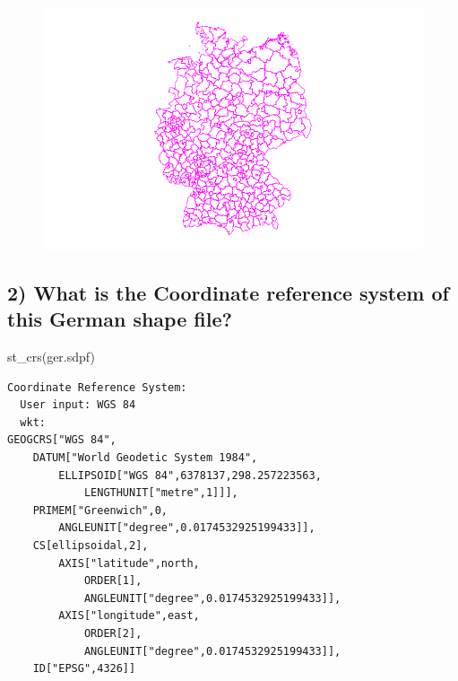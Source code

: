 \documentclass[
  letterpaper,
]{scrbook}
\newenvironment{Shaded}{\begin{snugshade}}{\end{snugshade}}
\newcommand{\FunctionTok}[1]{\textcolor[rgb]{0.28,0.35,0.67}{#1}}
\newcommand{\NormalTok}[1]{\textcolor[rgb]{0.00,0.23,0.31}{#1}}
\begin{document}
\begin{figure}[H]

{\centering \includegraphics{03_exercise1_files/figure-pdf/unnamed-chunk-4-1.pdf}

}

\end{figure}

\hypertarget{what-is-the-coordinate-reference-system-of-this-german-shape-file}{%
\subsection*{2) What is the Coordinate reference system of this German
shape
file?}\label{what-is-the-coordinate-reference-system-of-this-german-shape-file}}

\begin{Shaded}
\begin{Highlighting}[]
\FunctionTok{st\_crs}\NormalTok{(ger.sdpf)}
\end{Highlighting}
\end{Shaded}

\begin{verbatim}
Coordinate Reference System:
  User input: WGS 84 
  wkt:
GEOGCRS["WGS 84",
    DATUM["World Geodetic System 1984",
        ELLIPSOID["WGS 84",6378137,298.257223563,
            LENGTHUNIT["metre",1]]],
    PRIMEM["Greenwich",0,
        ANGLEUNIT["degree",0.0174532925199433]],
    CS[ellipsoidal,2],
        AXIS["latitude",north,
            ORDER[1],
            ANGLEUNIT["degree",0.0174532925199433]],
        AXIS["longitude",east,
            ORDER[2],
            ANGLEUNIT["degree",0.0174532925199433]],
    ID["EPSG",4326]]
\end{verbatim}
\end{document}
